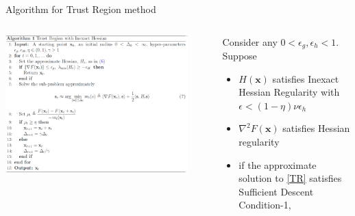 \documentclass{beamer}
\newcommand{\h}{\nabla^{2}}
\newcommand{\xbold}{\mathbf{x}}
\begin{document}
\begin{frame}{Algorithm for Trust Region method}
\begin{columns}
\centering
\includegraphics[width=0.9\textwidth]{./images/algo-1.png}
\begin{theorem}
Consider any \(0 < \epsilon_{g}, \epsilon_{h} < 1\). Suppose
\begin{itemize}
\item<1->{\(H(\xbold)\) satisfies Inexact Hessian Regularity with \(\epsilon < (1 - \eta)\nu\epsilon_{h}\)}
\item<2->{\(\h F(\xbold)\) satisfies Hessian regularity}
\item<3->{if the approximate solution to \ref{TR} satisfies Sufficient Descent Condition-1}, 
\end{itemize}
\end{theorem}
\end{columns}
\end{frame}
\end{document}

